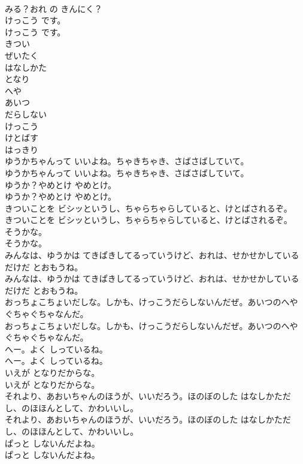 \documentclass[8pt]{extreport}
\begin{document}
\begin{CJK}{UTF8}{min}
\\	みる？おれ の きんにく？
\\	けっこう です。
\\	けっこう です。
\\	きつい
\\	ぜいたく
\\	はなしかた
\\	となり
\\	へや
\\	あいつ
\\	だらしない
\\	けっこう
\\	けとばす
\\	はっきり
\\	ゆうかちゃんって いいよね。ちゃきちゃき、さばさばしていて。
\\	ゆうかちゃんって いいよね。ちゃきちゃき、さばさばしていて。
\\	ゆうか？やめとけ やめとけ。
\\	ゆうか？やめとけ やめとけ。
\\	きついことを ビシッというし、ちゃらちゃらしていると、けとばされるぞ。
\\	きついことを ビシッというし、ちゃらちゃらしていると、けとばされるぞ。
\\	そうかな。
\\	そうかな。
\\	みんなは、ゆうかは てきぱきしてるっていうけど、おれは、せかせかしているだけだ とおもうね。
\\	みんなは、ゆうかは てきぱきしてるっていうけど、おれは、せかせかしているだけだ とおもうね。
\\	おっちょこちょいだしな。しかも、けっこうだらしないんだぜ。あいつのへや ぐちゃぐちゃなんだ。
\\	おっちょこちょいだしな。しかも、けっこうだらしないんだぜ。あいつのへや ぐちゃぐちゃなんだ。
\\	へー。よく しっているね。
\\	へー。よく しっているね。
\\	いえが となりだからな。
\\	いえが となりだからな。
\\	それより、あおいちゃんのほうが、いいだろう。ほのぼのした はなしかただし、のほほんとして、かわいいし。
\\	それより、あおいちゃんのほうが、いいだろう。ほのぼのした はなしかただし、のほほんとして、かわいいし。
\\	ぱっと しないんだよね。
\\	ぱっと しないんだよね。

\end{CJK}
\end{document}
